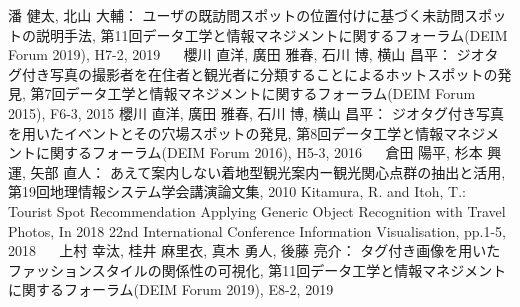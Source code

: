 \documentclass{deimj}
\begin{document}
\begin{thebibliography}{10}
    潘 健太, 北山 大輔：
      ユーザの既訪問スポットの位置付けに基づく未訪問スポットの説明手法,
      第11回データ工学と情報マネジメントに関するフォーラム(DEIM Forum 2019), H7-2, 2019
    櫻川 直洋, 廣田 雅春, 石川 博, 横山 昌平：
      ジオタグ付き写真の撮影者を在住者と観光者に分類することによるホットスポットの発見,
      第7回データ工学と情報マネジメントに関するフォーラム(DEIM Forum 2015), F6-3, 2015
    櫻川 直洋, 廣田 雅春, 石川 博, 横山 昌平：
      ジオタグ付き写真を用いたイベントとその穴場スポットの発見,
      第8回データ工学と情報マネジメントに関するフォーラム(DEIM Forum 2016), H5-3, 2016
    倉田 陽平, 杉本 興運, 矢部 直人：
      あえて案内しない着地型観光案内ー観光関心点群の抽出と活用,
      第19回地理情報システム学会講演論文集, 2010
    Kitamura, R. and Itoh, T.:
      Tourist Spot Recommendation Applying Generic Object Recognition with Travel Photos,
      In 2018 22nd International Conference Information Visualisation, pp.1-5, 2018
    上村 幸汰, 桂井 麻里衣, 真木 勇人, 後藤 亮介：
      タグ付き画像を用いたファッションスタイルの関係性の可視化,
      第11回データ工学と情報マネジメントに関するフォーラム(DEIM Forum 2019), E8-2, 2019
\end{thebibliography}
\end{document}

